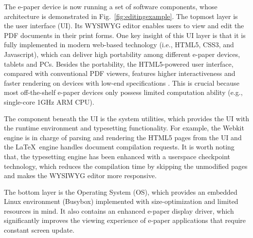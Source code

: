 \documentclass[]{sigchi}
\begin{document}
The e-paper device is now running a set of software components, whose architecture is demonstrated in Fig.~\ref{fig:editingexample}.
The topmost layer is the user interface (UI). Its WYSIWYG editor enables users to view and edit the PDF documents in their print forms. 
One key insight of this UI layer is that it is fully implemented in modern web-based technology (i.e., HTML5, CSS3, and Javascript), which 
can deliver high portability among different e-paper devices, tablets and PCs. Besides the portability, the HTML5-powered user interface, compared with conventional PDF viewers, features higher interactiveness and faster rendering on devices with low-end specifications \cite{peroni2017research,wang2013onlineperformance}. This is crucial because most off-the-shelf e-paper devices only possess limited computation ability (e.g., single-core 1GHz ARM CPU).


The component beneath the UI is the system utilities, which provides the UI with the runtime environment and typesetting functionality. 
For example, the Webkit engine is in charge of parsing and rendering the HTML5 pages from the UI and the \LaTeX\ engine handles document compilation requests.
It is worth noting that, the typesetting engine has been enhanced with a userspace checkpoint technology, which reduces the compilation time by skipping the unmodified pages and makes the WYSIWYG editor more responsive.




The bottom layer is the Operating System (OS), which provides an embedded Linux environment (Busybox) implemented with size-optimization and limited resources in mind. It also contains an enhanced e-paper display driver, which significantly improves the viewing experience of e-paper applications that require constant screen update. 
\end{document}
